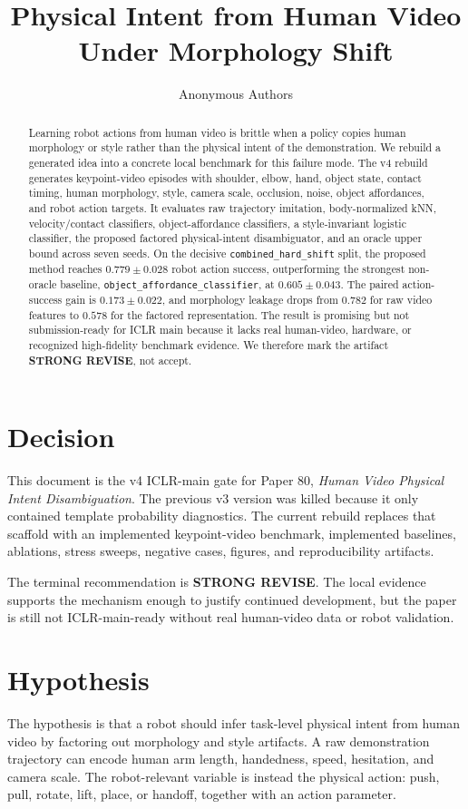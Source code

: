 \documentclass{article}
\title{Physical Intent from Human Video Under Morphology Shift}
\author{Anonymous Authors}
\begin{document}
\maketitle

\begin{abstract}
Learning robot actions from human video is brittle when a policy copies human morphology or style rather than the physical intent of the demonstration. We rebuild a generated idea into a concrete local benchmark for this failure mode. The v4 rebuild generates keypoint-video episodes with shoulder, elbow, hand, object state, contact timing, human morphology, style, camera scale, occlusion, noise, object affordances, and robot action targets. It evaluates raw trajectory imitation, body-normalized kNN, velocity/contact classifiers, object-affordance classifiers, a style-invariant logistic classifier, the proposed factored physical-intent disambiguator, and an oracle upper bound across seven seeds. On the decisive \texttt{combined\_hard\_shift} split, the proposed method reaches $0.779 \pm 0.028$ robot action success, outperforming the strongest non-oracle baseline, \texttt{object\_affordance\_classifier}, at $0.605 \pm 0.043$. The paired action-success gain is $0.173 \pm 0.022$, and morphology leakage drops from $0.782$ for raw video features to $0.578$ for the factored representation. The result is promising but not submission-ready for ICLR main because it lacks real human-video, hardware, or recognized high-fidelity benchmark evidence. We therefore mark the artifact \textbf{STRONG REVISE}, not accept.
\end{abstract}

\section{Decision}
This document is the v4 ICLR-main gate for Paper 80, \emph{Human Video Physical Intent Disambiguation}. The previous v3 version was killed because it only contained template probability diagnostics. The current rebuild replaces that scaffold with an implemented keypoint-video benchmark, implemented baselines, ablations, stress sweeps, negative cases, figures, and reproducibility artifacts.

The terminal recommendation is \textbf{STRONG REVISE}. The local evidence supports the mechanism enough to justify continued development, but the paper is still not ICLR-main-ready without real human-video data or robot validation.

\section{Hypothesis}
The hypothesis is that a robot should infer task-level physical intent from human video by factoring out morphology and style artifacts. A raw demonstration trajectory can encode human arm length, handedness, speed, hesitation, and camera scale. The robot-relevant variable is instead the physical action: push, pull, rotate, lift, place, or handoff, together with an action parameter.
\end{document}
